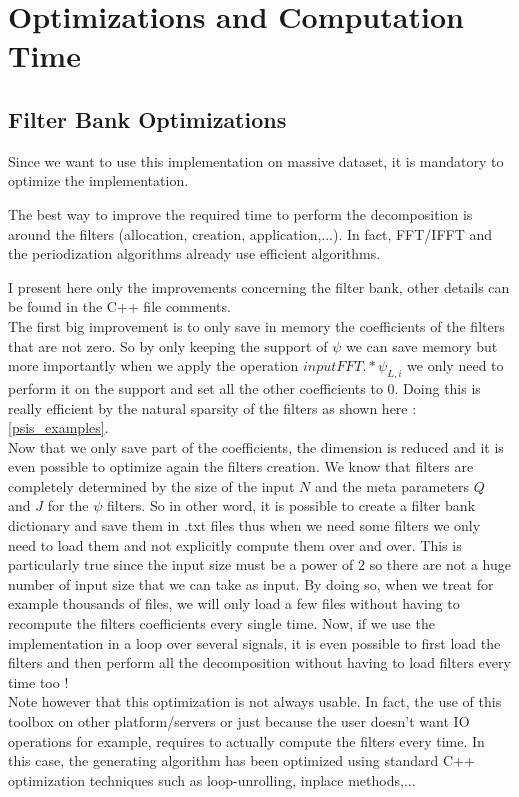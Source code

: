 \documentclass[a4paper]{report}
\begin{document}
\section{Optimizations and Computation Time}
\subsection{Filter Bank Optimizations}
Since we want to use this implementation on massive dataset, it is mandatory to optimize the implementation.

The best way to improve the required time to perform the decomposition is around the filters (allocation, creation, application,...). In fact, FFT/IFFT and the periodization algorithms already use efficient algorithms. 


I present here only the improvements concerning the filter bank, other details can be found in the C++ file comments.\\ 
The first big improvement is to only save in memory the coefficients of the filters that are not zero. So by only keeping the support of $\psi$ we can save memory but more importantly when we apply the operation $inputFFT .* \psi_{L,i}$ we only need to perform it on the support and set all the other coefficients to $0$. Doing this is really efficient by the natural sparsity of the filters as shown here : \ref{psis_examples}.
\\
Now that we only save part of the coefficients, the dimension is reduced and it is even possible to optimize again the filters creation. We know that filters are completely determined by the size of the input $N$ and the meta parameters $Q$ and $J$ for the $\psi$ filters. So in other word, it is possible to create a filter bank dictionary and save them in .txt files thus when we need some filters we only need to load them and not explicitly compute them over and over. This is particularly true since the input size must be a power of $2$ so there are not a huge number of input size that we can take as input.
By doing so, when we treat for example thousands of files, we will only load a few files without having to recompute the filters coefficients every single time.
Now, if we use the implementation in a loop over several signals, it is even possible to first load the filters and then perform all the decomposition without having to load filters every time too ! 
\\Note however that this optimization is not always usable. In fact, the use of this toolbox on other platform/servers or just because the user doesn't want IO operations for example, requires to actually compute the filters every time. In this case, the generating algorithm has been optimized using standard C++ optimization techniques such as loop-unrolling, inplace methods,...
\end{document}
